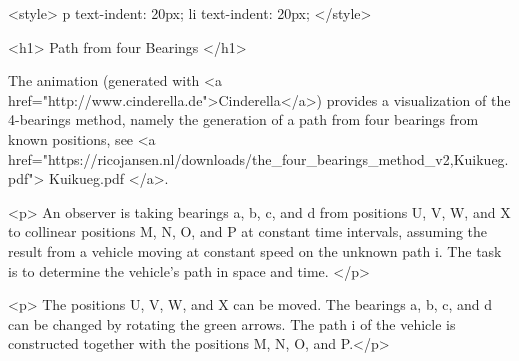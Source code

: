 <style>
p {
  text-indent: 20px;
}
li {
  text-indent: 20px;
}
</style>

<h1> Path from four Bearings </h1> 

The animation (generated with <a
    href="http://www.cinderella.de">Cinderella</a>) provides a visualization of the 4-bearings method, namely the generation of a path from four bearings from known positions, see <a href="https://ricojansen.nl/downloads/the_four_bearings_method_v2,Kuikueg.pdf"> Kuikueg.pdf </a>.
		
<p>  An observer is taking bearings a, b, c, and d from positions U, V, W, and X to collinear positions M, N, O, and P at constant time intervals, assuming the result from a vehicle moving at constant speed on the unknown path i. The task is to determine the vehicle's path in space and time.  </p>
    
<p> The positions U, V, W, and X can be moved. The bearings a, b, c, and d can be changed by rotating the green arrows. The path i of the vehicle is constructed together with the positions M, N, O, and P.</p>
